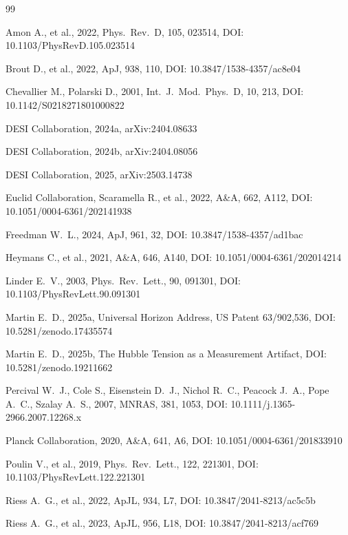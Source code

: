\documentclass[12pt,a4paper]{article}
\begin{document}
\begin{thebibliography}{99}

Amon A., et al., 2022, Phys.\ Rev.\ D, 105, 023514,
DOI: 10.1103/PhysRevD.105.023514

Brout D., et al., 2022, ApJ, 938, 110,
DOI: 10.3847/1538-4357/ac8e04

Chevallier M., Polarski D., 2001, Int.\ J.\ Mod.\ Phys.\ D, 10, 213,
DOI: 10.1142/S0218271801000822

DESI Collaboration, 2024a, arXiv:2404.08633

DESI Collaboration, 2024b, arXiv:2404.08056

DESI Collaboration, 2025, arXiv:2503.14738

Euclid Collaboration, Scaramella R., et al., 2022, A\&A, 662, A112,
DOI: 10.1051/0004-6361/202141938

Freedman W.~L., 2024, ApJ, 961, 32,
DOI: 10.3847/1538-4357/ad1bac

Heymans C., et al., 2021, A\&A, 646, A140,
DOI: 10.1051/0004-6361/202014214

Linder E.~V., 2003, Phys.\ Rev.\ Lett., 90, 091301,
DOI: 10.1103/PhysRevLett.90.091301

Martin E.~D., 2025a, Universal Horizon Address, US Patent 63/902,536,
DOI: 10.5281/zenodo.17435574

Martin E.~D., 2025b, The Hubble Tension as a Measurement Artifact,
DOI: 10.5281/zenodo.19211662

Percival W.~J., Cole S., Eisenstein D.~J., Nichol R.~C., Peacock J.~A.,
Pope A.~C., Szalay A.~S., 2007, MNRAS, 381, 1053,
DOI: 10.1111/j.1365-2966.2007.12268.x

Planck Collaboration, 2020, A\&A, 641, A6,
DOI: 10.1051/0004-6361/201833910

Poulin V., et al., 2019, Phys.\ Rev.\ Lett., 122, 221301,
DOI: 10.1103/PhysRevLett.122.221301

Riess A.~G., et al., 2022, ApJL, 934, L7,
DOI: 10.3847/2041-8213/ac5c5b

Riess A.~G., et al., 2023, ApJL, 956, L18,
DOI: 10.3847/2041-8213/acf769

\end{thebibliography}
\end{document}
